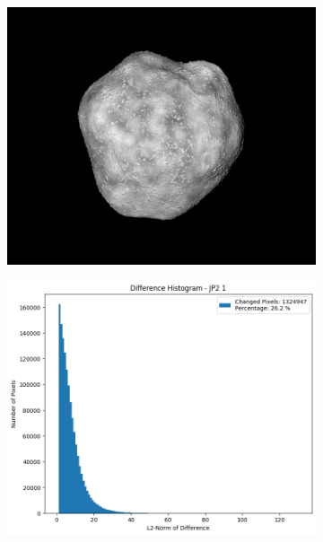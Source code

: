 \begin{figure}[htb]
    \centering
    \begin{subfigure}[b]{0.48\textwidth}
        \centering
        \includegraphics[width=\textwidth]{doc/thesis/0_figures/compare_quality/set1/jp2_1.png}
        \caption{}
        \label{fig:img_quality_comp_jp2_1_orig}
    \end{subfigure}
    \begin{subfigure}[b]{0.48\textwidth}
        \centering
        \includegraphics[width=\textwidth]{doc/thesis/0_figures/compare_quality/set1/jp2_1_diff_histogram.png}

\end{subfigure}
\end{figure}
